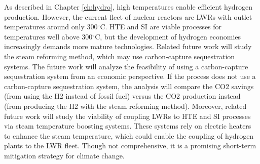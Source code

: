 As described in Chapter \ref{ch:hydro}, high temperatures enable efficient hydrogen production.
However, the current fleet of nuclear reactors are LWRs with outlet temperatures around only 300$^{\circ}$C.
HTE and SI are viable processes for temperatures well above 300$^{\circ}$C, but the development of hydrogen economies increasingly demands more mature technologies.
Related future work will study the steam reforming method, which may use carbon-capture sequestration systems.
The future work will analyze the feasibility of using a carbon-capture sequestration system from an economic perspective.
If the process does not use a carbon-capture sequestration system, the analysis will compare the \gls{CO2} savings (from using the \gls{H2} instead of fossil fuel) versus the \gls{CO2} production instead (from producing the \gls{H2} with the steam reforming method).
Moreover, related future work will study the viability of coupling LWRs to HTE and SI processes via steam temperature boosting systems.
These systems rely on electric heaters to enhance the steam temperature, which could enable the coupling of hydrogen plants to the LWR fleet.
Though not comprehensive, it is a promising short-term mitigation strategy for climate change.
